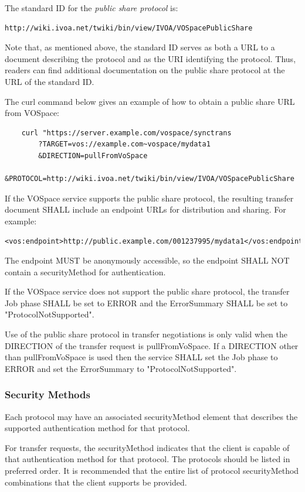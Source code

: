 \documentclass[11pt,a4paper]{ivoa}
\begin{document}
The standard ID for the \emph{public share protocol} is:
\begin{verbatim}http://wiki.ivoa.net/twiki/bin/view/IVOA/VOSpacePublicShare\end{verbatim}

Note that, as mentioned above, the standard ID serves as both a URL to a document describing the protocol and as the URI identifying the protocol.  Thus, readers can find additional documentation on the public share protocol at the URL of the standard ID.

The curl command below gives an example of how to obtain a public share URL from VOSpace:

\begin{verbatim}
    curl "https://server.example.com/vospace/synctrans
        ?TARGET=vos://example.com~vospace/mydata1
        &DIRECTION=pullFromVoSpace
        &PROTOCOL=http://wiki.ivoa.net/twiki/bin/view/IVOA/VOSpacePublicShare
\end{verbatim}

If the VOSpace service supports the public share protocol, the resulting transfer document SHALL include an endpoint URLs for distribution and sharing.  For example:

\begin{verbatim}<vos:endpoint>http://public.example.com/001237995/mydata1</vos:endpoint>\end{verbatim}

The endpoint MUST be anonymously accessible, so the endpoint SHALL NOT contain a securityMethod for authentication.

If the VOSpace service does not support the public share protocol, the transfer Job phase SHALL be set to ERROR and the ErrorSummary SHALL be set to "ProtocolNotSupported".

Use of the public share protocol in transfer negotiations is only valid when the DIRECTION of the transfer request is pullFromVoSpace.	  If a DIRECTION other than pullFromVoSpace is used then the service SHALL set the Job phase to ERROR and set the ErrorSummary to "ProtocolNotSupported".

\subsubsection{Security Methods}
Each protocol may have an associated securityMethod element that describes the supported authentication method for that protocol.

For transfer requests, the securityMethod indicates that the client is capable of that authentication method for that protocol.  The protocols should be listed in preferred order.  It is recommended that the entire list of protocol securityMethod combinations that the client supports be provided.
\end{document}
